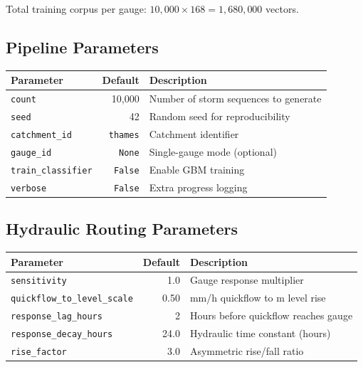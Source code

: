 \documentclass[11pt,a4paper]{article}
\begin{document}
Total training corpus per gauge: $10{,}000 \times 168 = 1{,}680{,}000$ vectors.

\mkminputs

\subsection{Pipeline Parameters}

\begin{center}
\begin{tabular}{lrl}
\toprule
\textbf{Parameter} & \textbf{Default} & \textbf{Description} \\
\midrule
\texttt{count} & 10{,}000 & Number of storm sequences to generate \\
\texttt{seed} & 42 & Random seed for reproducibility \\
\texttt{catchment\_id} & \texttt{thames} & Catchment identifier \\
\texttt{gauge\_id} & \texttt{None} & Single-gauge mode (optional) \\
\texttt{train\_classifier} & \texttt{False} & Enable GBM training \\
\texttt{verbose} & \texttt{False} & Extra progress logging \\
\bottomrule
\end{tabular}
\end{center}

\subsection{Hydraulic Routing Parameters}

\begin{center}
\begin{tabular}{lrl}
\toprule
\textbf{Parameter} & \textbf{Default} & \textbf{Description} \\
\midrule
\texttt{sensitivity} & 1.0 & Gauge response multiplier \\
\texttt{quickflow\_to\_level\_scale} & 0.50 & mm/h quickflow to m level rise \\
\texttt{response\_lag\_hours} & 2 & Hours before quickflow reaches gauge \\
\texttt{response\_decay\_hours} & 24.0 & Hydraulic time constant (hours) \\
\texttt{rise\_factor} & 3.0 & Asymmetric rise/fall ratio \\
\bottomrule
\end{tabular}
\end{center}
\end{document}

